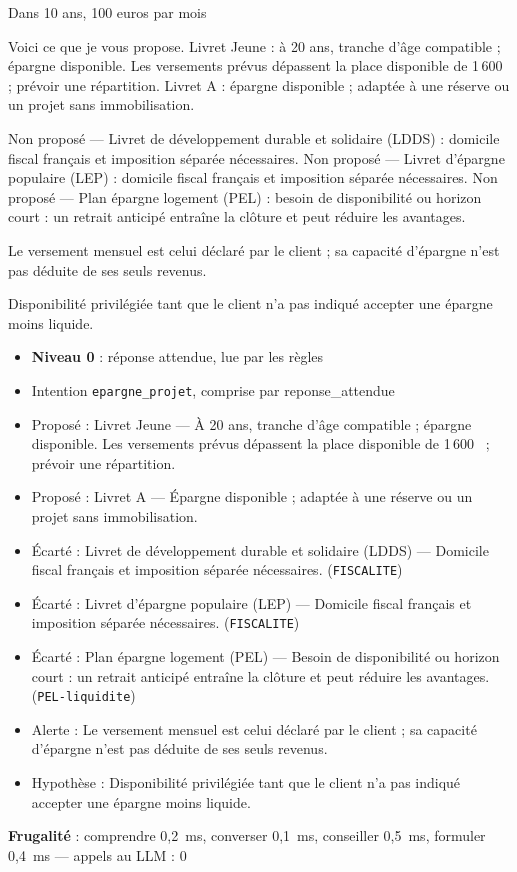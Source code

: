 \documentclass[11pt,a4paper]{article}
\newcommand{\frugal}[1]{{\scriptsize\color{darkgray}\textbf{Frugalité} : #1}\par\medskip}
\begin{document}
\begin{client}Dans 10 ans, 100 euros par mois\end{client}
\begin{assistant}Voici ce que je vous propose. Livret Jeune : à 20 ans, tranche d'âge compatible ; épargne disponible. Les versements prévus dépassent la place disponible de 1\,600~\texteuro{} ; prévoir une répartition. Livret A : épargne disponible ; adaptée à une réserve ou un projet sans immobilisation.\par Non proposé — Livret de développement durable et solidaire (LDDS) : domicile fiscal français et imposition séparée nécessaires. Non proposé — Livret d'épargne populaire (LEP) : domicile fiscal français et imposition séparée nécessaires. Non proposé — Plan épargne logement (PEL) : besoin de disponibilité ou horizon court : un retrait anticipé entraîne la clôture et peut réduire les avantages.\par Le versement mensuel est celui déclaré par le client ; sa capacité d'épargne n'est pas déduite de ses seuls revenus.\par Disponibilité privilégiée tant que le client n'a pas indiqué accepter une épargne moins liquide.\end{assistant}
\begin{pourquoi}
\begin{itemize}
\item \textbf{Niveau 0} : réponse attendue, lue par les règles
\item Intention \texttt{epargne\_projet}, comprise par reponse\_attendue
\item Proposé : Livret Jeune --- À 20 ans, tranche d'âge compatible ; épargne disponible. Les versements prévus dépassent la place disponible de 1\,600~\texteuro{} ; prévoir une répartition.
\item Proposé : Livret A --- Épargne disponible ; adaptée à une réserve ou un projet sans immobilisation.
\item Écarté : Livret de développement durable et solidaire (LDDS) --- Domicile fiscal français et imposition séparée nécessaires. (\texttt{FISCALITE})
\item Écarté : Livret d'épargne populaire (LEP) --- Domicile fiscal français et imposition séparée nécessaires. (\texttt{FISCALITE})
\item Écarté : Plan épargne logement (PEL) --- Besoin de disponibilité ou horizon court : un retrait anticipé entraîne la clôture et peut réduire les avantages. (\texttt{PEL-liquidite})
\item Alerte : Le versement mensuel est celui déclaré par le client ; sa capacité d'épargne n'est pas déduite de ses seuls revenus.
\item Hypothèse : Disponibilité privilégiée tant que le client n'a pas indiqué accepter une épargne moins liquide.
\end{itemize}
\end{pourquoi}
\frugal{comprendre 0,2~ms, converser 0,1~ms, conseiller 0,5~ms, formuler 0,4~ms --- appels au LLM : 0}
\end{document}
